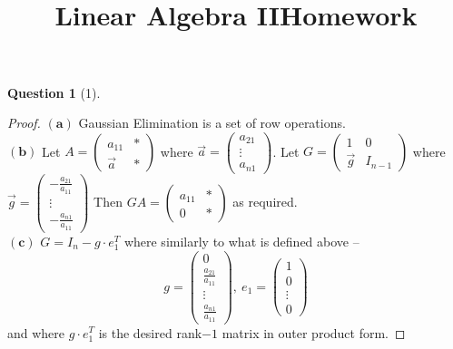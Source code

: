 \documentclass[11pt]{article}
\title{\vspace{-50pt}
\Huge \name
\\\vspace{20pt}
\huge Linear Algebra II\hfill Homework \hw}
\author{}
\date{}
\theoremstyle{quest}
\newtheorem*{question}{Question}
\begin{document}
\maketitle

\begin{question}[1]
\end{question}
\begin{proof}
$\mathbf{(a)}$ Gaussian Elimination is a set of row operations.
\\$\mathbf{(b)}$ Let $A = \begin{pmatrix}
a_{11} & * \\
\vec{a} & * \end{pmatrix}$ where $\vec{a} = \begin{pmatrix}
a_{21} \\
\vdots \\
a_{n1}
\end{pmatrix}$. Let $G = \begin{pmatrix}
1 & 0 \\
\vec{g} & I_{n-1}
\end{pmatrix}$ where $\vec{g} = \begin{pmatrix}
-\frac{a_{21}}{a_{11}} \\
\vdots \\
-\frac{a_{n1}}{a_{11}}
\end{pmatrix}$
Then $GA = \begin{pmatrix}
a_{11} & * \\
0 & *
\end{pmatrix} $ as required.
\\$\mathbf{(c)}$ $G = I_n - g \cdot e_1^T$ where similarly to what is defined above --
$$g = \begin{pmatrix}
0 \\
\frac{a_{21}}{a_{11}} \\
\vdots \\
\frac{a_{n1}}{a_{11}}
\end{pmatrix},\ e_1 = \begin{pmatrix}
1 \\
0 \\
\vdots \\
0
\end{pmatrix}$$
and where $g \cdot e_1^T$ is the desired rank$-1$ matrix in outer product form.
\end{proof}
\end{document}
